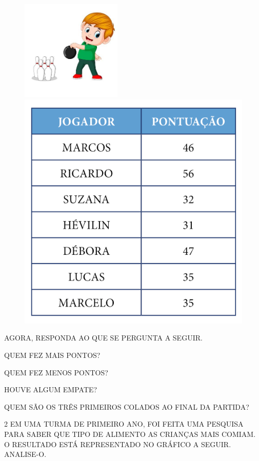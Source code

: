 \begin{figure}[htpb!]
\centering
\includegraphics[width=1.88542in,height=1.88542in]{media/image95.jpg}
\includegraphics[width=.5\textwidth]{./media/SAEB_1ANO_MAT_FIGURA96.png}
\end{figure}

AGORA, RESPONDA AO QUE SE PERGUNTA A SEGUIR.

\begin{escolha}
\item QUEM FEZ MAIS PONTOS?

\item QUEM FEZ MENOS PONTOS?

\item HOUVE ALGUM EMPATE?

\item QUEM SÃO OS TRÊS PRIMEIROS COLADOS AO FINAL DA PARTIDA?
\end{escolha}

\pagebreak
\num{2} EM UMA TURMA DE PRIMEIRO ANO, FOI FEITA UMA PESQUISA PARA SABER QUE TIPO DE ALIMENTO AS
CRIANÇAS MAIS COMIAM. O RESULTADO ESTÁ REPRESENTADO NO GRÁFICO A SEGUIR. ANALISE-O.

